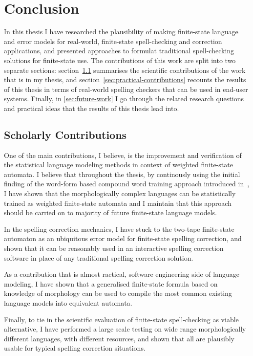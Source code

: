 \documentclass[officiallayout,draft]{unihelcompling}
\begin{document}
\chapter{Conclusion}
\label{chap:conclusion}

In this thesis I have researched the plausibility of making finite-state
language and error models for real-world, finite-state spell-checking and
correction applications, and presented approaches to formulat traditional
spell-checking solutions for finite-state use. The contributions of this work
are split into two separate sections: section~\ref{sec:scholarly-contributions}
summarises the scientific contributions of the work that is in my thesis, and
section~\ref{sec:practical-contributions} recounts the results of this thesis
in terms of real-world spelling checkers that can be used in end-user systems.
Finally, in \ref{sec:future-work} I go through the related research questions
and practical ideas that the results of this thesis lead into.

\section{Scholarly Contributions}
\label{sec:scholarly-contributions}

One of the main contributions, I believe, is the improvement and verification
of the statistical language modeling methods in context of weighted 
finite-state automata. I believe that throughout the thesis, by continously
using the initial finding of the word-form based compound word training
approach introduced in~, I have shown that the
morphologically complex languages can be statistically trained as weighted
finite-state automata and I maintain that this approach should be carried on
to majority of future finite-state language models.

In the spelling correction mechanics, I have stuck to the two-tape finite-state
automaton as an ubiquitous error model for finite-state spelling correction,
and shown that it can be reasonably used in an interactive spelling correction
software in place of any traditional spelling correction solution.

As a contribution that is almost ractical, software engineering side of
language modeling, I have shown that a generalised finite-state formula based
on knowledge of morphology can be used to compile the most common existing
language models into equivalent automata.

Finally, to tie in the scientific evaluation of finite-state spell-checking as
viable alternative, I have performed a large scale testing on wide range
morphologically different languages, with different resources, and shown that
all are plausibly usable for typical spelling correction situations.
\end{document}
